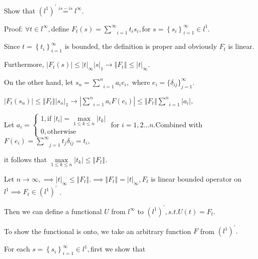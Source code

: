 \documentclass{article}
\begin{document}
Show that $\left( l^{1}\right) ^{\prime }\overset{is-is}{=}l^{\infty }.$

Proof: $\forall t\in l^{\infty },$define $F_{t}\left( s\right) =\underset{i=1%
}{\overset{\infty }{\sum }}t_{i}s_{i},$for $s=\left\{ s_{i}\right\}
_{i=1}^{\infty }\in l^{1}.$

Since $t=\left\{ t_{i}\right\} _{i=1}^{\infty }$ is bounded, the definition
is proper and obviously $F_{t}$ is linear.

Furthermore, $\left\vert F_{t}\left( s\right) \right\vert \leq \left\vert
t\right\vert _{\infty }\left\vert s\right\vert _{1}\rightarrow \left\Vert
F_{t}\right\Vert \leq \left\vert t\right\vert _{\infty }.$

On the other hand, let $s_{n}=\underset{i=1}{\overset{n}{\sum }}a_{i}e_{i},$%
where $e_{i}=\{\delta _{ij}\}_{j=1}^{\infty }.$

$\left\vert F_{t}\left( s_{n}\right) \right\vert \leq \left\Vert
F_{t}\right\Vert \left\vert s_{n}\right\vert _{1}\rightarrow \left\vert 
\underset{i=1}{\overset{n}{\sum }}a_{i}F\left( e_{i}\right) \right\vert \leq
\left\Vert F_{t}\right\Vert \underset{i=1}{\overset{n}{\sum }}\left\vert
a_{i}\right\vert ,$

Let $a_{i}=\left\{ 
\begin{array}{c}
1,\text{if }\left\vert t_{i}\right\vert =\underset{1\leq k\leq n}{\max }%
\left\vert t_{k}\right\vert  \\ 
0,\text{otherwise}%
\end{array}%
\right. $ for $i=1,2...n.$Combined with $F\left( e_{i}\right) =\underset{j=1}%
{\overset{\infty }{\sum }}t_{j}\delta _{ij}=t_{i},$

it follows that $\underset{1\leq k\leq n}{\max }\left\vert t_{k}\right\vert
\leq \left\Vert F_{t}\right\Vert .$

Let $n\rightarrow \infty ,\implies \left\vert t\right\vert _{\infty }\leq
\left\Vert F_{t}\right\Vert .\implies \left\Vert F_{t}\right\Vert
=\left\vert t\right\vert _{\infty },F_{t}$ is linear bounded operator on $%
l^{1}\implies F_{t}\in \left( l^{1}\right) ^{\prime }$ .

Then we can define a functional $U$ from $l^{\infty }$ to $\left(
l^{1}\right) ^{\prime },s.t.U\left( t\right) =F_{t}.$

To show the functional is onto, we take an arbitrary function $F$ from $%
\left( l^{1}\right) ^{\prime }.$

For each $s=\left\{ s_{i}\right\} _{i=1}^{\infty }\in l^{1},$first we show
that 
\end{document}
